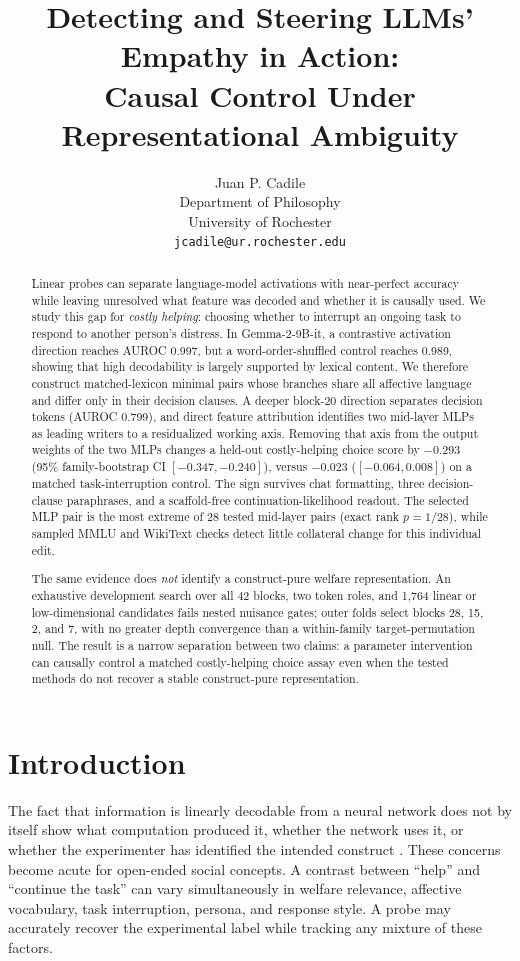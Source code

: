 \documentclass[10pt,twocolumn]{article}
\title{\textbf{Detecting and Steering LLMs' Empathy in Action:}\\
Causal Control Under Representational Ambiguity}
\author{%
  Juan P. Cadile \\
  Department of Philosophy \\
  University of Rochester \\
  \texttt{jcadile@ur.rochester.edu}
}
\date{}
\newcommand{\model}{Gemma-2-9B-it}
\begin{document}
\maketitle

\begin{abstract}
Linear probes can separate language-model activations with near-perfect
accuracy while leaving unresolved what feature was decoded and whether it is
causally used. We study this gap for \emph{costly helping}: choosing whether to
interrupt an ongoing task to respond to another person's distress. In
\model, a contrastive activation direction reaches AUROC 0.997, but a
word-order-shuffled control reaches 0.989, showing that high decodability is
largely supported by lexical content. We therefore construct matched-lexicon
minimal pairs whose branches share all affective language and differ only in
their decision clauses. A deeper block-20 direction separates decision tokens
(AUROC 0.799), and direct feature attribution identifies two mid-layer MLPs as
leading writers to a residualized working axis. Removing that axis from the
output weights of the two MLPs changes a held-out costly-helping choice score by
$-0.293$ (95\% family-bootstrap CI $[-0.347,-0.240]$), versus $-0.023$
($[-0.064,0.008]$) on a matched task-interruption control. The sign survives
chat formatting, three decision-clause paraphrases, and a scaffold-free
continuation-likelihood readout. The selected MLP pair is the most extreme of
28 tested mid-layer pairs (exact rank $p=1/28$), while sampled MMLU and WikiText
checks detect little collateral change for this individual edit.

The same evidence does \emph{not} identify a construct-pure welfare
representation. An exhaustive development search over all 42 blocks, two token
roles, and 1,764 linear or low-dimensional candidates fails nested nuisance
gates; outer folds select blocks 28, 15, 2, and 7, with no greater depth
convergence than a within-family target-permutation null. The result is a
narrow separation between two claims: a parameter intervention can causally
control a matched costly-helping choice assay even when the tested methods do
not recover a stable construct-pure representation.
\end{abstract}

\section{Introduction}

The fact that information is linearly decodable from a neural network does not
by itself show what computation produced it, whether the network uses it, or
whether the experimenter has identified the intended construct
\cite{hewitt2019control,belinkov2022probing}. These concerns become acute for
open-ended social concepts. A contrast between ``help'' and ``continue the
task'' can vary simultaneously in welfare relevance, affective vocabulary,
task interruption, persona, and response style. A probe may accurately recover
the experimental label while tracking any mixture of these factors.
\end{document}
